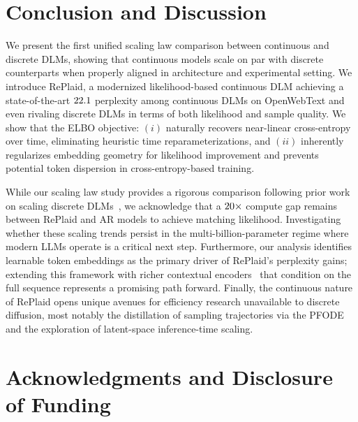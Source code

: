 \documentclass{article}
\begin{document}
%


%
%

%

%
%

%




\section{Conclusion and Discussion}
\label{sec:conclusion}

We present the first unified scaling law comparison between continuous and discrete DLMs, showing that continuous models scale on par with discrete counterparts when properly aligned in architecture and experimental setting. We introduce RePlaid, a modernized likelihood-based continuous DLM achieving a state-of-the-art $22.1$ perplexity among continuous DLMs on OpenWebText and even rivaling discrete DLMs in terms of both likelihood and sample quality. We show that the ELBO objective: $(i)$ naturally recovers near-linear cross-entropy over time, eliminating heuristic time reparameterizations, and $(ii)$ inherently regularizes embedding geometry for likelihood improvement and prevents potential token dispersion in cross-entropy-based training.

While our scaling law study provides a rigorous comparison following prior work on scaling discrete DLMs~\citep{nie2025scaling, sahoo2026scaling}, we acknowledge that a $20\times$ compute gap remains between RePlaid and AR models to achieve matching likelihood. Investigating whether these scaling trends persist in the multi-billion-parameter regime where modern LLMs operate is a critical next step. Furthermore, our analysis identifies learnable token embeddings as the primary driver of RePlaid's perplexity gains; extending this framework with richer contextual encoders~\citep{meshchaninov2025cosmos} that condition on the full sequence represents a promising path forward. Finally, the continuous nature of RePlaid opens unique avenues for efficiency research unavailable to discrete diffusion, most notably the distillation of sampling trajectories via the PFODE and the exploration of latent-space inference-time scaling.

%

%

\section*{Acknowledgments and Disclosure of Funding}
\end{document}
